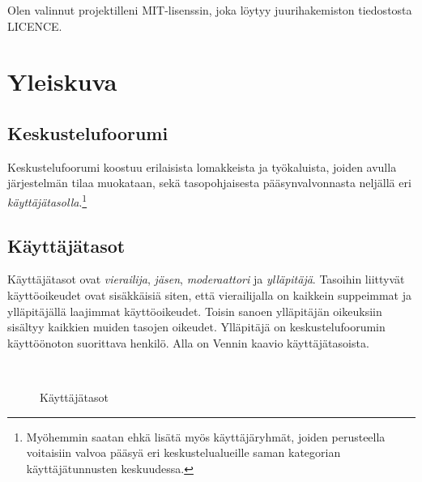 \documentclass[11pt]{article}
\begin{document}
	Olen valinnut projektilleni MIT-lisenssin, joka löytyy juurihakemiston tiedostosta LICENCE.
	
\newpage
\thispagestyle{plain}

\section{Yleiskuva}
	\subsection{Keskustelufoorumi}
		Keskustelufoorumi koostuu erilaisista lomakkeista ja työkaluista, joiden avulla järjestelmän tilaa
		muokataan, sekä tasopohjaisesta pääsynvalvonnasta neljällä eri \emph{käyttäjätasolla}.\footnote{
		Myöhemmin saatan ehkä lisätä myös käyttäjäryhmät, joiden perusteella voitaisiin valvoa
		pääsyä eri keskustelualueille saman kategorian käyttäjätunnusten keskuudessa.}
	
	\subsection{Käyttäjätasot}
		Käyttäjätasot ovat \emph{vierailija}, \emph{jäsen}, \emph{moderaattori} ja \emph{ylläpitäjä}.
		Tasoihin liittyvät käyttöoikeudet ovat sisäkkäisiä siten, että vierailijalla on kaikkein suppeimmat
		ja ylläpitäjällä laajimmat käyttöoikeudet. Toisin sanoen ylläpitäjän oikeuksiin sisältyy kaikkien
		muiden tasojen oikeudet. Ylläpitäjä on keskustelufoorumin käyttöönoton suorittava henkilö. Alla on
		Vennin kaavio käyttäjätasoista.
	
		\begin{figure}[H]
			\vspace{1cm}
			\centering
			\\
			\caption{Käyttäjätasot}
		\end{figure}
	
\end{document}
